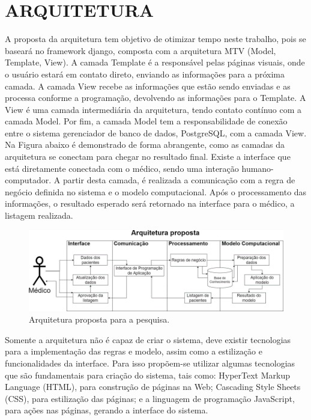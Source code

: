 \documentclass[12pt]{article}
\begin{document}
\section{ARQUITETURA}
A proposta da arquitetura tem objetivo de otimizar tempo neste trabalho, pois se baseará no framework django, composta com a arquitetura MTV (Model, Template, View). A camada Template é a responsável pelas páginas visuais, onde o usuário estará em contato direto, enviando as informações para a próxima camada. A camada View recebe as informações que estão sendo enviadas e as processa conforme a programação, devolvendo as informações para o Template. A View é uma camada intermediária da arquitetura, tendo contato contínuo com a camada Model. Por fim, a camada Model tem a responsabilidade de conexão entre o sistema gerenciador de banco de dados, PostgreSQL, com a camada View.
Na Figura abaixo é demonstrado de forma abrangente, como as camadas da arquitetura se conectam para chegar no resultado final. Existe a interface que está diretamente conectada com o médico, sendo uma interação humano-computador. A partir desta camada, é realizada a comunicação com a regra de negócio definida no sistema e o modelo computacional. Após o processamento das informações, o resultado esperado será retornado na interface para o médico, a listagem realizada.

\begin{figure}[!htb]
    \centering
    \includegraphics[scale=0.9]{img/Arquitetura-MDS.png}
    \centering
    \caption{Arquitetura proposta para a pesquisa.}
    \label{subexpressao1}
\end{figure}

Somente a arquitetura não é capaz de criar o sistema, deve existir tecnologias para a implementação das regras e modelo, assim como a estilização e funcionalidades da interface. Para isso propõem-se utilizar algumas tecnologias que são fundamentais para criação do sistema, tais como: HyperText Markup Language (HTML), para construção de páginas na Web; Cascading Style Sheets (CSS), para estilização das páginas; e a linguagem de programação JavaScript, para ações nas páginas, gerando a interface do sistema.
\end{document}

